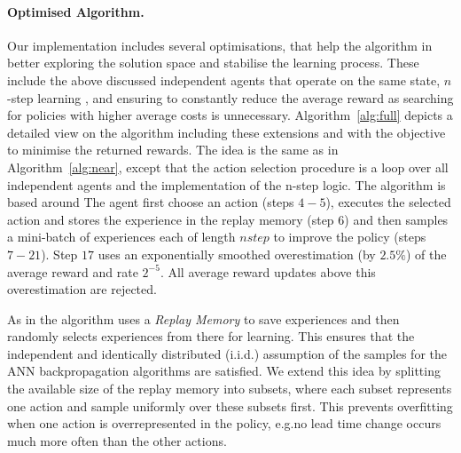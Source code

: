 \documentclass[envcountsame]{llncs}
\begin{document}
\paragraph*{Optimised Algorithm.}
Our implementation includes several optimisations, that help the algorithm in better exploring the
solution space and stabilise the learning process. These include the above discussed independent
agents that operate on the same state, \(n\)-step learning \citep{mnih2016asynchronous},
and ensuring to constantly reduce the average reward as searching for policies with higher average
costs is unnecessary. Algorithm~\ref{alg:full}
depicts a detailed view on the algorithm including these extensions and with the objective to
minimise the returned rewards. The idea is the same as in Algorithm~\ref{alg:near}, except that the
action selection procedure is a loop over all independent agents and the implementation of the
n-step logic.
%
The algorithm is based around The agent first choose an action (steps \(4-5\)), executes the
selected action and stores the experience in the replay memory (step \(6\)) and then samples a
mini-batch of experiences each of length \(nstep\) to improve the policy (steps \(7-21\)). Step
\(17\) uses an exponentially smoothed overestimation (by \(2.5\%\)) of the average reward and rate
\(2^{-5}\). All average reward updates above this overestimation are rejected.


As in \citep{mnih2016asynchronous, mnih2015human} the algorithm uses a \textit{Replay Memory} to
save experiences and then randomly selects experiences from there for learning. This ensures that
the independent and identically distributed (i.i.d.) assumption of the samples for the ANN
backpropagation algorithms are satisfied. We extend this idea by splitting the available size of the
replay memory into subsets, where each subset represents one action and sample uniformly over these
subsets first. This prevents overfitting when one action is overrepresented in the policy, e.g.\@ no
lead time change occurs much more often than the other actions.
\end{document}

